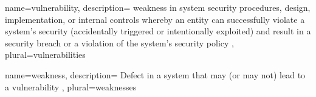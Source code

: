 {
    name=vulnerability,
    description={
        \Gls{weakness} in system security procedures, design, implementation, or internal controls whe\-reby an entity can successfully violate a system’s security (accidentally triggered or intentionally exploited) and result in a security breach or a violation of the system's security policy \cite{okun2016sate}
    },
    plural=vulnerabilities
}

{
    name=weakness,
    description={
        Defect in a system that may (or may not) lead to a vulnerability \cite{okun2016sate}
    },
    plural=weaknesses
}